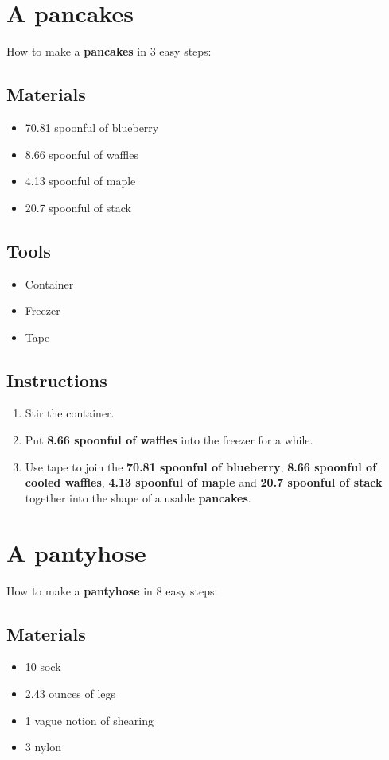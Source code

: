 \documentclass{article}
\begin{document}
\section{A pancakes}How to make a \textbf{pancakes} in 3 easy steps:

\subsection{Materials}\begin{itemize}
\item 
70.81 spoonful of blueberry
\item 
8.66 spoonful of waffles
\item 
4.13 spoonful of maple
\item 
20.7 spoonful of stack
\end{itemize}
\subsection{Tools}\begin{itemize}
\item 
Container
\item 
Freezer
\item 
Tape
\end{itemize}
\subsection{Instructions}\begin{enumerate}
\item 
Stir the container.
\item 
Put \textbf{8.66 spoonful of waffles} into the freezer for a while.
\item 
Use tape to join the \textbf{70.81 spoonful of blueberry}, \textbf{8.66 spoonful of cooled waffles}, \textbf{4.13 spoonful of maple} and \textbf{20.7 spoonful of stack} together into the shape of a usable \textbf{pancakes}.
\end{enumerate}
\newpage
\section{A pantyhose}How to make a \textbf{pantyhose} in 8 easy steps:

\subsection{Materials}\begin{itemize}
\item 
10 sock
\item 
2.43 ounces of legs
\item 
1 vague notion of shearing
\item 
3 nylon
\end{itemize}
\end{document}
